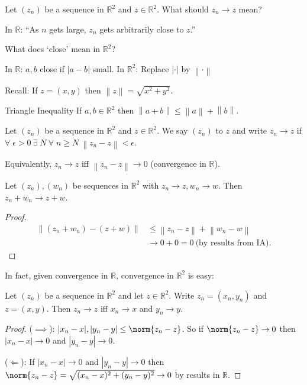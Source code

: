 Let $(z_n)$ be a sequence in $\mathbb{R}^2$ and $z \in \mathbb{R}^2$.
What should $z_n \to z$ mean?

In $\mathbb{R}$: ``As $n$ gets large, $z_n$ gets arbitrarily close to $z$.''

What does `close' mean in $\mathbb{R}^2$?

In $\mathbb{R}$: $a, b$ close if $|a - b|$ small.
In $\mathbb{R}^2$: Replace $|\cdot|$ by $\left \lVert \cdot \right \rVert $

Recall: If $z = (x, y)$ then $\left \lVert z \right \rVert = \sqrt{x^2 + y^2}$.

Triangle Inequality If $a, b \in \mathbb{R}^2$ then $\left \lVert a + b \right \rVert \leq \left \lVert a \right \rVert + \left \lVert b \right \rVert$.

\begin{definition}
    Let $(z_n)$ be a sequence in $\mathbb{R}^2$ and $z \in \mathbb{R}^2$.
    We say $(z_n)$  to $z$ and write $z_n \to z$ if $\forall \; \epsilon > 0 \ \exists \; N \ \forall \; n \geq N \ \left \lVert z_n - z \right \rVert < \epsilon$. 

    Equivalently, $z_n \to z$ iff $\left \lVert z_n - z \right \rVert \to 0$ (convergence in $\mathbb{R}$).
\end{definition} 

\begin{example}
    Let $(z_n), (w_n)$ be sequences in $\mathbb{R}^2$ with $z_n \to z, w_n \to w$. 
    Then $z_n + w_n \to z + w$.
\end{example} 

\begin{proof}
    \begin{align*}
        \left \lVert (z_n + w_n) - (z + w) \right \rVert &\leq \left \lVert z_n - z \right \rVert + \left \lVert w_n - w \right \rVert \\
        &\to 0 + 0 = 0 \ \text{(by results from IA)}.
    \end{align*} 
\end{proof} 

In fact, given convergence in $\mathbb{R}$, convergence in $\mathbb{R}^2$ is easy:
\begin{proposition} \label{prop:one}
    Let $(z_n)$ be a sequence in $\mathbb{R}^2$ and let $z \in \mathbb{R}^2$.
    Write $z_n = (x_n, y_n)$ and $z = (x, y)$.
    Then $z_n \to z$ iff $x_n \to x$ and $y_n \to y$.
\end{proposition} 

\begin{proof}
    ($\implies$): $|x_n - x|, |y_n - y| \leq \norm{z_n - z}$.
    So if $\norm{z_n - z} \to 0$ then $|x_n - x| \to 0$ and $|y_n - y| \to 0$.

    ($\Longleftarrow$): If $|x_n - x| \to 0$ and $|y_n - y| \to 0$ then $\norm{z_n - z} = \sqrt{(x_n - x)^2 + (y_n - y)^2} \to 0$ by results in $\mathbb{R}$.
\end{proof} 

